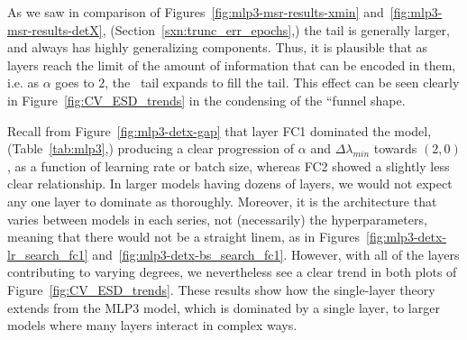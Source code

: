 As we saw in comparison of Figures~\ref{fig:mlp3-msr-results-xmin} and~\ref{fig:mlp3-msr-results-detX}, 
(Section~\ref{sxn:trunc_err_epochs},) the \TRACELOG tail is generally larger, and always has highly generalizing 
components. Thus, it is plausible that as layers reach the limit of the amount of information that can be encoded in 
them, i.e. as $\alpha$ goes to $2$, the \POWERLAW~tail expands to fill the \TRACELOG tail. This effect can be seen 
clearly in Figure~\ref{fig:CV_ESD_trends} in the condensing of the ``funnel shape.

Recall from Figure~\ref{fig:mlp3-detx-gap} that layer FC1 dominated the model, (Table~\ref{tab:mlp3},) producing a clear 
progression of $\alpha$ and $\Delta\lambda_{min}$ towards $(2, 0)$, as a function of learning rate or batch size, whereas FC2 showed a slightly less clear relationship. 
In larger models having dozens of layers, we would not expect any one layer to dominate as thoroughly.
Moreover, it is the architecture that varies between models in each series, not (necessarily) the hyperparameters, meaning that there would not be a straight linem, as in Figures~\ref{fig:mlp3-detx-lr_search_fc1} and~\ref{fig:mlp3-detx-bs_search_fc1}. 
However, with all of the layers contributing to varying degrees, we nevertheless see a clear trend in both plots of Figure~\ref{fig:CV_ESD_trends}. 
These results show how the single-layer \SETOL theory extends from the MLP3 model, which is dominated by a single layer, to larger models where many layers interact in complex ways.


